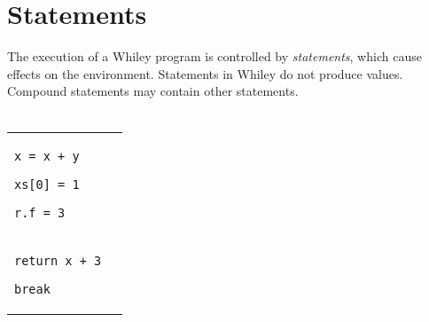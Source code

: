 \documentclass[a4paper,10pt,twcolumn]{article}
\begin{document}
\section*{Statements}
The execution of a Whiley program is controlled by {\em statements}, which cause effects on the environment.  Statements in Whiley do not produce values.  Compound statements may contain other statements.\\\\
\begin{tabular}{lr}
\begin{minipage}[t]{2.25cm}
\begin{lstlisting}
x = x + y
\end{lstlisting}
\end{minipage}
\hspace*{0.25cm}
\begin{minipage}[t]{2.25cm}
\begin{lstlisting}
xs[0] = 1
\end{lstlisting}
\end{minipage}
\hspace*{0.25cm}
\begin{minipage}[t]{2cm}
\begin{lstlisting}
r.f = 3
\end{lstlisting}
\end{minipage}\\


\begin{minipage}[t]{3cm}
\begin{lstlisting}
return x + 3
\end{lstlisting}
\end{minipage}
\hspace*{0.25cm}
\begin{minipage}[t]{1.75cm}
\begin{lstlisting}
break
\end{lstlisting}
\end{minipage}\\


\end{tabular}
\end{document}
